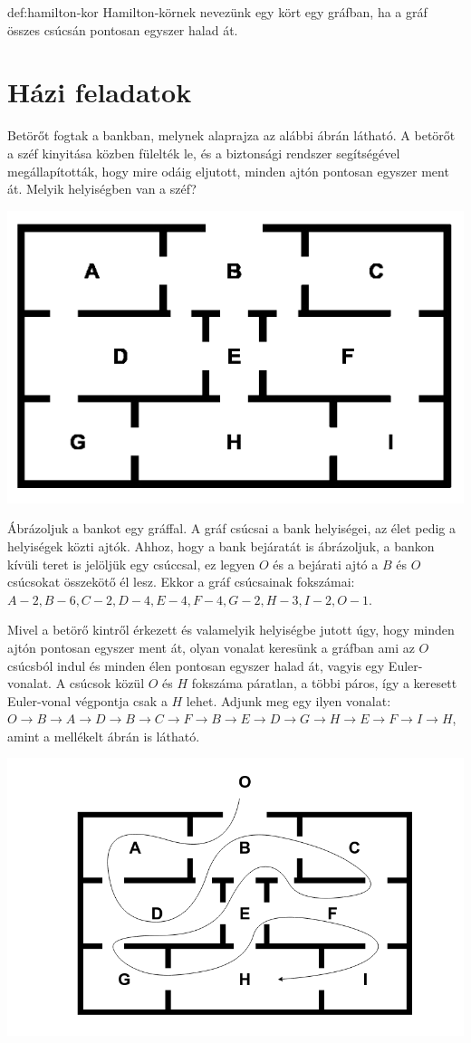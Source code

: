 \begin{definition}{def:hamilton-kor}
    Hamilton-körnek nevezünk egy kört egy gráfban, ha a gráf összes csúcsán pontosan egyszer halad át.
\end{definition}

\section*{Házi feladatok}
\begin{problem}
	Betörőt fogtak a bankban, melynek alaprajza az alábbi ábrán látható.
	A betörőt a széf kinyitása közben fülelték le, és a biztonsági rendszer segítségével megállapították, hogy mire odáig eljutott, minden ajtón pontosan egyszer ment át.
	Melyik helyiségben van a széf?
	\begin{center}
		\includegraphics[width=0.5\linewidth]{content/Csurka_Molnar_Hanna-Kis_Aranka_Eniko-Gergely_Verona/betoro2.png}
	\end{center}
\end{problem}
\begin{solution}
	Ábrázoljuk a bankot egy gráffal.
	A gráf csúcsai a bank helyiségei, az élet pedig a helyiségek közti ajtók.
	Ahhoz, hogy a bank bejáratát is ábrázoljuk, a bankon kívüli teret is jelöljük egy csúccsal, ez legyen $O$ és a bejárati ajtó a $B$ és $O$ csúcsokat összekötő él lesz.
	Ekkor a gráf csúcsainak fokszámai: $A-2, B-6, C-2, D-4, E-4, F-4, G-2, H-3, I-2, O-1$.
	
	Mivel a betörő kintről érkezett és valamelyik helyiségbe jutott úgy, hogy minden ajtón pontosan egyszer ment át, olyan vonalat keresünk a gráfban ami az $O$ csúcsból indul és minden élen pontosan egyszer halad át, vagyis egy Euler-vonalat.
	A csúcsok közül $O$ és $H$ fokszáma páratlan, a többi páros, így a keresett Euler-vonal végpontja csak a $H$ lehet.
	Adjunk meg egy ilyen vonalat: $O\rightarrow B\rightarrow A\rightarrow D\rightarrow B\rightarrow C\rightarrow F\rightarrow B\rightarrow E\rightarrow D\rightarrow G\rightarrow H\rightarrow E\rightarrow F\rightarrow I\rightarrow H$, amint a mellékelt ábrán is látható.
	\begin{center}
		\includegraphics[width=0.5\linewidth]{content/Csurka_Molnar_Hanna-Kis_Aranka_Eniko-Gergely_Verona/betoro_megoldas.png}
	\end{center}
\end{solution}
